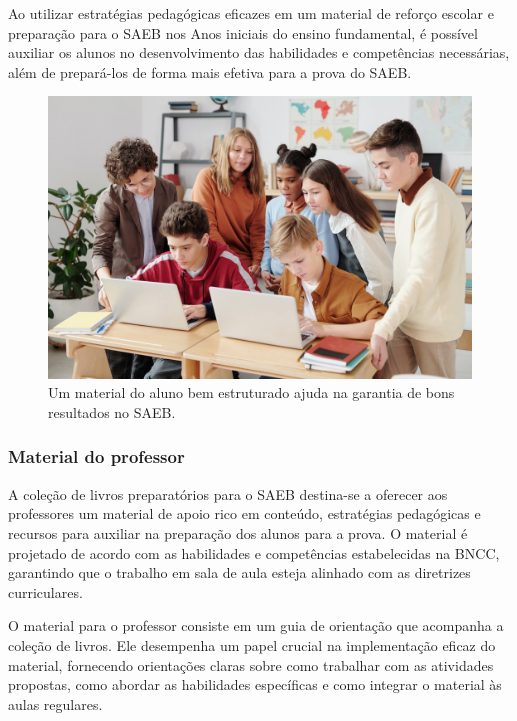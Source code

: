 Ao utilizar estratégias pedagógicas eficazes em um material de reforço
escolar e preparação para o SAEB nos Anos iniciais do ensino
fundamental, é possível auxiliar os alunos no desenvolvimento das
habilidades e competências necessárias, além de prepará-los de forma
mais efetiva para a prova do SAEB.

\begin{figure}
\centering
\includegraphics[width=\textwidth]{./imgs/Imagem009.jpg}
\caption{Um material do aluno bem estruturado ajuda na garantia de bons
resultados no SAEB.}
\end{figure}

\subsubsection{Material do professor}\label{material-do-professor}

A coleção de livros preparatórios para o SAEB destina-se a oferecer aos
professores um material de apoio rico em conteúdo, estratégias
pedagógicas e recursos para auxiliar na preparação dos alunos para a
prova. O material é projetado de acordo com as habilidades e
competências estabelecidas na BNCC, garantindo que o trabalho em sala de
aula esteja alinhado com as diretrizes curriculares.

O material para o professor consiste em um guia de orientação que
acompanha a coleção de livros. Ele desempenha um papel crucial na
implementação eficaz do material, fornecendo orientações claras sobre
como trabalhar com as atividades propostas, como abordar as habilidades
específicas e como integrar o material às aulas regulares.

